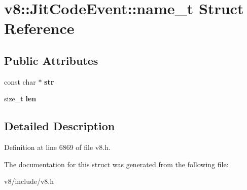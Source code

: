 \hypertarget{structv8_1_1JitCodeEvent_1_1name__t}{}\section{v8\+:\+:Jit\+Code\+Event\+:\+:name\+\_\+t Struct Reference}
\label{structv8_1_1JitCodeEvent_1_1name__t}
\subsection*{Public Attributes}
\begin{DoxyCompactItemize}
\item 
\mbox{\label{structv8_1_1JitCodeEvent_1_1name__t_a344732b4289a6a1fd21bb577ac9eff15}} 
const char $\ast$ {\bfseries str}
\item 
\mbox{\label{structv8_1_1JitCodeEvent_1_1name__t_aa85ddd240f3b08c995caa8267ee8c586}} 
size\+\_\+t {\bfseries len}
\end{DoxyCompactItemize}


\subsection{Detailed Description}


Definition at line 6869 of file v8.\+h.



The documentation for this struct was generated from the following file\+:\begin{DoxyCompactItemize}
\item 
v8/include/v8.\+h\end{DoxyCompactItemize}
